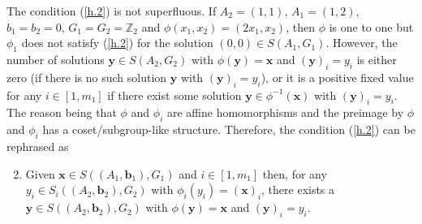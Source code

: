 \documentclass[10pt]{article}
\newcommand{\Z}{\mathbb Z}
\begin{document}
The condition (\ref{h.2}) is not superfluous. If $A_2=(1,1)$, $A_1=(1,2)$, $b_1=b_2=0$, $G_1=G_2=\Z_2$ and $\phi(x_1,x_2)=(2x_1,x_2)$, then $\phi$ is one to one but $\phi_1$ does not satisfy (\ref{h.2}) for the solution $(0,0)\in S(A_1,G_1)$. However, the number of solutions $\mathbf{y}\in S(A_2,G_2)$ with $\phi(\mathbf{y})=\mathbf{x}$ and $(\mathbf{y})_i=y_i$ is either zero (if there is no such solution $\mathbf{y}$ with $(\mathbf{y})_i=y_i$), or it is a positive fixed value for any $i\in[1,m_1]$ if there exist some solution $\mathbf{y}\in \phi^{-1}(\mathbf{x})$ with $(\mathbf{y})_i=y_i$. The reason being that $\phi$ and $\phi_i$ are affine homomorphisms and the preimage by $\phi$ and $\phi_i$ has a coset/subgroup-like structure. Therefore, the condition (\ref{h.2}) can be rephrased as
\begin{enumerate}[(i')]
		  \setcounter{enumi}{1}
	\item \label{h.2'} Given $\mathbf{x}\in S((A_1,\mathbf{b}_1),G_1)$ and $i\in[1,m_1]$
then, for any  $y_i\in S_i((A_2,\mathbf{b}_2),G_2)$ with $\phi_i(y_i)=(\mathbf{x})_i$, there exists a $\mathbf{y}\in S((A_2,\mathbf{b}_2),G_2)$ with $\phi(\mathbf{y})=\mathbf{x}$ and $(\mathbf{y})_i=y_i$.
\end{enumerate}
\end{document}
